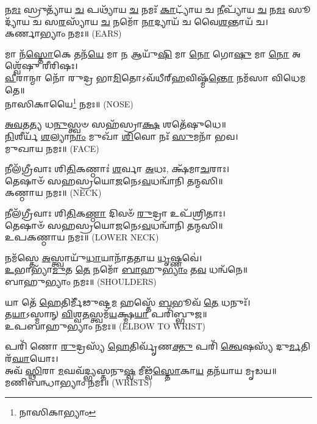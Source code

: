 𑌨\-\ul{𑌮𑌃} 𑌸𑍍𑌰𑍁𑌤𑍍𑌯𑌾᳴𑌯 \ul{𑌚} 𑌪𑌥𑍍𑌯𑌾᳴𑌯 \ul{𑌚} 𑌨𑌮𑌃᳴ \ul{𑌕𑌾}\-𑌟𑍍𑌯𑌾᳴𑌯 𑌚 \ul{𑌨𑍀}\-𑌪𑍍𑌯𑌾᳴𑌯 \ul{𑌚} %
 𑌨\-\ul{𑌮𑌃} 𑌸𑍂𑌦𑍍𑌯𑌾᳴𑌯 𑌚 𑌸\-\ul{𑌰}\-𑌸𑍍𑌯𑌾᳴𑌯 \ul{𑌚} 𑌨𑌮𑍋᳴ \ul{𑌨𑌾}\-𑌦𑍍𑌯𑌾𑌯᳴ 𑌚 𑌵𑍈\-\ul{𑌶}\-𑌨𑍍𑌤𑌾𑌯᳴ 𑌚।\\
𑌕𑌰𑍍𑌣𑌾𑌭𑍍𑌯𑌾𑌂 𑌨𑌮𑌃॥ {\scriptsize (EARS)}

𑌮𑌾 𑌨᳴\-\ul{𑌸𑍍𑌤𑍋}\-𑌕𑍇 𑌤𑌨᳴\-\ul{𑌯𑍇} 𑌮𑌾 \ul{𑌨} 𑌆𑌯𑍁᳴\-\ul{𑌷𑌿} 𑌮𑌾 \ul{𑌨𑍋} 𑌗𑍋\-\ul{𑌷𑍁} 𑌮𑌾 \ul{𑌨𑍋} 𑌅𑌶𑍍𑌵𑍇᳴𑌷𑍁 𑌰𑍀𑌰𑌿𑌷𑌃।\\
 \ul{𑌵𑍀}\-𑌰𑌾𑌨𑍍𑌮𑌾 𑌨𑍋᳴ 𑌰𑍁𑌦𑍍𑌰 𑌭𑌾\-\ul{𑌮𑌿}\-𑌤𑍋𑌽𑌵᳴𑌧𑍀𑌰𑍍‌\-\ul{𑌹}\-𑌵𑌿𑌷𑍍𑌮᳴\-\ul{𑌨𑍍𑌤𑍋} 𑌨𑌮᳴𑌸𑌾 𑌵𑌿𑌧𑍇𑌮 𑌤𑍇॥ \\
𑌨𑌾𑌸𑌿𑌕𑌾𑌯𑍈\footnote{𑌨𑌾𑌸𑌿𑌕𑌾𑌭𑍍𑌯𑌾𑌂} 𑌨𑌮𑌃॥ {\scriptsize (NOSE)}

\-\ul{𑌅}\-\-\ul{𑌵}\-𑌤\-\ul{𑌤𑍍𑌯} 𑌧\-\ul{𑌨𑍁}\-𑌸𑍍𑌤𑍍𑌵𑍞 𑌸𑌹᳴𑌸𑍍𑌰𑌾\-\ul{𑌕𑍍𑌷} 𑌶𑌤𑍇᳴𑌷𑍁𑌧𑍇॥\\
 \ul{𑌨𑌿}\-𑌶𑍀𑌰𑍍𑌯᳴ \ul{𑌶}\-𑌲𑍍𑌯𑌾\-\ul{𑌨𑌾𑌂} 𑌮𑍁𑌖𑌾᳴ \ul{𑌶𑌿}\-𑌵𑍋 𑌨𑌃᳴ \ul{𑌸𑍁}\-𑌮𑌨𑌾᳴ 𑌭𑌵।\\
𑌮𑍁𑌖𑌾𑌯 𑌨𑌮𑌃॥ {\scriptsize (FACE)}

 𑌨𑍀𑌲᳴𑌗𑍍𑌰𑍀𑌵𑌾𑌃 𑌶𑌿\-\ul{𑌤𑌿}\-𑌕𑌣𑍍𑌠𑌾𑌃॑ \ul{𑌶}\-𑌰𑍍𑌵𑌾 \ul{𑌅}\-𑌧𑌃, 𑌕𑍍𑌷᳴𑌮𑌾\-\ul{𑌚}\-𑌰𑌾𑌃।\\
 𑌤𑍇𑌷𑌾𑍞᳴ 𑌸𑌹𑌸𑍍𑌰𑌯𑍋\-\ul{𑌜}\-𑌨𑍇𑌽\-\ul{𑌵}\-𑌧𑌨𑍍𑌵𑌾᳴𑌨𑌿 𑌤𑌨𑍍𑌮𑌸𑌿॥\\
𑌕𑌣𑍍𑌠𑌾𑌯 𑌨𑌮𑌃॥ {\scriptsize (NECK)}

𑌨𑍀𑌲᳴𑌗𑍍𑌰𑍀𑌵𑌾𑌃 𑌶𑌿\-\ul{𑌤𑌿}\-𑌕\-\ul{𑌣𑍍𑌠𑌾} 𑌦𑌿𑌵𑍞᳴ \ul{𑌰𑍁}\-𑌦𑍍𑌰𑌾 𑌉𑌪᳴𑌶𑍍𑌰𑌿𑌤𑌾𑌃।\\
 𑌤𑍇𑌷𑌾𑍞᳴ 𑌸𑌹𑌸𑍍𑌰𑌯𑍋\-\ul{𑌜}\-𑌨𑍇𑌽\-\ul{𑌵}\-𑌧𑌨𑍍𑌵𑌾᳴𑌨𑌿 𑌤𑌨𑍍𑌮𑌸𑌿॥\\
𑌉𑌪𑌕𑌣𑍍𑌠𑌾𑌯 𑌨𑌮𑌃॥ {\scriptsize (LOWER NECK)}

𑌨𑌮᳴𑌸𑍍𑌤𑍇 \ul{𑌅}\-𑌸𑍍𑌤𑍍𑌵𑌾𑌯𑍁᳴\-\ul{𑌧𑌾}\-𑌯𑌾𑌨𑌾᳴𑌤𑌤𑌾𑌯 \ul{𑌧𑍃}\-𑌷𑍍𑌣𑌵𑍇॑।\\
 \ul{𑌉}\-𑌭𑌾𑌭𑍍𑌯𑌾᳴\-\ul{𑌮𑍁}\-𑌤 \ul{𑌤𑍇} 𑌨𑌮𑍋᳴ \ul{𑌬𑌾}\-𑌹𑍁\-\ul{𑌭𑍍𑌯𑌾𑌂} 𑌤\-\ul{𑌵} 𑌧𑌨𑍍𑌵᳴𑌨𑍇॥\\
𑌬𑌾𑌹𑍁𑌭𑍍𑌯𑌾𑌂 𑌨𑌮𑌃॥ {\scriptsize (SHOULDERS)}


 𑌯𑌾 𑌤𑍇᳴ \ul{𑌹𑍇}\-𑌤𑌿𑌰𑍍𑌮𑍀᳴𑌢𑍁𑌷𑍍𑌟\-\ul{𑌮} 𑌹𑌸𑍍𑌤𑍇᳴ \ul{𑌬}\-𑌭𑍂𑌵᳴ \ul{𑌤𑍇} 𑌧𑌨𑍁𑌃᳴।\\
 𑌤\-\ul{𑌯𑌾}\-𑌽𑌸𑍍𑌮𑌾𑌨𑍍 \ul{𑌵𑌿}\-𑌶𑍍𑌵\-\ul{𑌤}\-𑌸𑍍𑌤𑍍𑌵𑌮᳴\-\ul{𑌯}\-𑌕𑍍𑌷𑍍𑌮\-\ul{𑌯𑌾} 𑌪𑌰𑌿᳴𑌬𑍍𑌭𑍁𑌜॥\\
𑌉𑌪𑌬𑌾𑌹𑍁𑌭𑍍𑌯𑌾𑌂 𑌨𑌮𑌃॥ {\scriptsize (ELBOW TO WRIST)}

𑌪𑌰𑌿᳴ 𑌣𑍋 \ul{𑌰𑍁}\-𑌦𑍍𑌰𑌸𑍍𑌯᳴ \ul{𑌹𑍇}\-𑌤𑌿𑌰𑍍𑌵𑍃᳴𑌣\-\ul{𑌕𑍍𑌤𑍁} 𑌪𑌰𑌿᳴ \ul{𑌤𑍍𑌵𑍇}\-𑌷𑌸𑍍𑌯᳴ 𑌦𑍁\-\ul{𑌰𑍍𑌮}\-𑌤𑌿𑌰᳴\-\ul{𑌘𑌾}\-𑌯𑍋𑌃।\\
 𑌅𑌵᳴ \ul{𑌸𑍍𑌥𑌿}\-𑌰𑌾 \ul{𑌮}\-𑌘𑌵᳴𑌦𑍍𑌭𑍍𑌯𑌸𑍍𑌤𑌨𑍁\-\ul{𑌷𑍍𑌵} 𑌮𑍀𑌢𑍍𑌵᳴\-\ul{𑌸𑍍𑌤𑍋}\-𑌕𑌾\-\ul{𑌯} 𑌤𑌨᳴𑌯𑌾𑌯 𑌮𑍃𑌡𑌯॥\\
𑌮𑌣𑌿𑌬𑌨𑍍𑌧𑌾𑌭𑍍𑌯𑌾𑌂 𑌨𑌮𑌃॥ {\scriptsize (WRISTS)}

